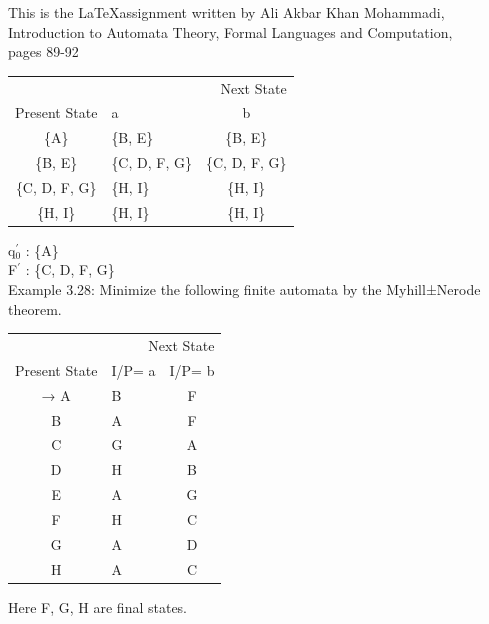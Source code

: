 \documentclass[11pt,apacite]{article}
\begin{document}
\begin{center}
This is the \LaTeX  assignment written by Ali Akbar Khan Mohammadi,\\ Introduction to Automata Theory, Formal Languages and Computation,\\ pages 89-92
\end{center}

\begin{center}
\begin{tabular}{clc}  
	\toprule
	\multicolumn{3}{r}{Next State} \\
	\cmidrule(r){2-3}
	Present State    & a & b \\
	\midrule
	\{A\}      & \{B, E\}   & \{B, E\}      \\
	\{B, E\} & \{C, D, F, G\}     & \{C, D, F, G\}      \\
	 \{C, D, F, G\}        & \{H, I\}     & \{H, I\}    \\
	\{H, I\}        & \{H, I\}      & \{H, I\}      \\
	\bottomrule
\end{tabular}
\end{center}	
q$_0^\prime$ : 	\{A\}\\
F$^\prime$ : 	\{C, D, F, G\}\\

Example 3.28: Minimize the following finite automata by the Myhill±Nerode theorem.\\

\begin{center}
	\begin{tabular}{clc}  
		\toprule
		\multicolumn{3}{r}{Next State} \\
		\cmidrule(r){2-3}
		Present State    & I/P= a & I/P= b \\
		\midrule
	  → A     & B  & F     \\
		B & A    & F      \\
		C        & G    & A   \\
		D        & H     & B      \\
		E 		 & A    & G      \\
		F        & H   & C   \\
		G        & A   & D   \\
		H        & A     & C      \\
		\bottomrule
	\end{tabular}
\end{center}
Here F, G, H are final states.\\
\end{document}
